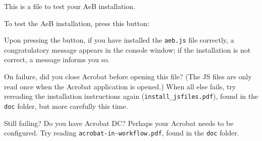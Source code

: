 \documentclass{article}
\begin{document}
This is a file to test your \textsf{AeB} installation.

To test the \textsf{AeB} installation, press this button:

Upon pressing the button, if you have installed the \texttt{aeb.js} file
correctly, a congratulatory message appears in the console window; if the
installation is not correct, a message informs you so.

On failure, did you close \textsf{Acrobat} before opening this file? (The JS
files are only read once when the \textsf{Acrobat} application is opened.)
When all else fails, try rereading the installation instructions again
(\texttt{install\_jsfiles.pdf}), found in the \texttt{doc} folder, but more
carefully this time.

Still failing? Do you have \textsf{Acrobat DC}? Perhaps your \textsf{Acrobat}
needs to be configured. Try reading \texttt{acrobat-in-workflow.pdf}, found
in the \texttt{doc} folder.
\end{document}
